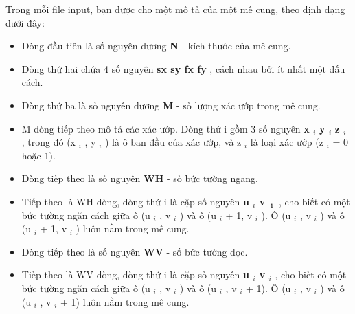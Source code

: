 Trong mỗi file input, bạn được cho một mô tả của một mê cung, theo định dạng dưới đây:
\begin{itemize}
	\item Dòng đầu tiên là số nguyên dương \textbf{ N } - kích thước của mê cung.
	\item Dòng thứ hai chứa 4 số nguyên \textbf{ sx sy fx fy } , cách nhau bởi ít nhất một dấu cách.
	\item Dòng thứ ba là số nguyên dương \textbf{ M } - số lượng xác ướp trong mê cung.
	\item M dòng tiếp theo mô tả các xác ướp. Dòng thứ i gồm 3 số nguyên \textbf{ x $_ i $}\textbf{ y $_ i $}\textbf{ z $_ i $} , trong đó (x $_ i $ , y $_ i $ ) là ô ban đầu của xác ướp, và z $_ i $ là loại xác ướp (z $_ i $ = 0 hoặc 1).
	\item Dòng tiếp theo là số nguyên \textbf{ WH } - số bức tường ngang.
	\item Tiếp theo là WH dòng, dòng thứ i là cặp số nguyên \textbf{ u $_ i $ v }$_\textbf{ i }$ , cho biết có một bức tường ngăn cách giữa ô (u $_ i $ , v $_ i $ ) và ô (u $_ i $ + 1, v $_ i $ ). Ô (u $_ i $ , v $_ i $ ) và ô (u $_ i $ + 1, v $_ i $ ) luôn nằm trong mê cung.
	\item Dòng tiếp theo là số nguyên \textbf{ WV } - số bức tường dọc.
	\item Tiếp theo là WV dòng, dòng thứ i là cặp số nguyên \textbf{ u $_ i $ v $_ i $} , cho biết có một bức tường ngăn cách giữa ô (u $_ i $ , v $_ i $ ) và ô (u $_ i $ , v $_ i $ + 1). Ô (u $_ i $ , v $_ i $ ) và ô (u $_ i $ , v $_ i $ + 1) luôn nằm trong mê cung.
\end{itemize}